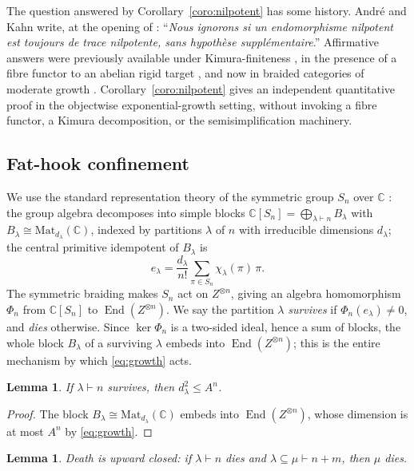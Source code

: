 \documentclass[11pt]{article}
\newtheorem{lemm}[theo]{Lemma}
\newcommand{\End}{\operatorname{End}}
\begin{document}
The question answered by Corollary~\ref{coro:nilpotent} has some
history. Andr\'e and Kahn write, at the opening of
\cite[\S7.3]{AK02}: ``\emph{Nous ignorons si un endomorphisme
nilpotent est toujours de trace nilpotente, sans hypoth\`ese
suppl\'ementaire}.'' Affirmative answers were previously available
under Kimura-finiteness \cite[Thm~9.2.2, Prop~7.3.3]{AK02}, in the
presence of a fibre functor to an abelian rigid target
\cite[Prop~7.3.3]{AK02}, and now in braided categories of moderate
growth \cite{EP26}. Corollary~\ref{coro:nilpotent} gives an
independent quantitative proof in the objectwise
exponential-growth setting, without invoking a fibre functor, a
Kimura decomposition, or the semisimplification machinery.

\subsection{Fat-hook confinement}\label{subsec:fathook}

We use the standard representation theory of the symmetric group
$S_{n}$ over $\mathbb{C}$ \cite{Sag01,FH91}: the group algebra
decomposes into simple blocks
$\mathbb{C}[S_{n}]=\bigoplus_{\lambda\vdash n}B_{\lambda}$ with
$B_{\lambda}\cong\mathrm{Mat}_{d_{\lambda}}(\mathbb{C})$, indexed
by partitions $\lambda$ of $n$ with irreducible dimensions
$d_{\lambda}$; the central primitive idempotent of $B_{\lambda}$ is
\[
e_{\lambda}
=\frac{d_{\lambda}}{n!}\sum_{\pi\in S_{n}}\chi_{\lambda}(\pi)\,\pi .
\]
The symmetric braiding makes $S_{n}$ act on $Z^{\otimes n}$, giving
an algebra homomorphism $\Phi_{n}$ from $\mathbb{C}[S_{n}]$ to
$\End(Z^{\otimes n})$. We say the
partition $\lambda$ \emph{survives} if
$\Phi_{n}(e_{\lambda})\ne 0$, and \emph{dies} otherwise. Since
$\ker\Phi_{n}$ is a two-sided ideal, hence a sum of blocks, the
whole block $B_{\lambda}$ of a surviving $\lambda$ embeds into
$\End(Z^{\otimes n})$; this is the entire mechanism by which
\eqref{eq:growth} acts.

\begin{lemm}\label{lemm:blockdeath}
If $\lambda\vdash n$ survives, then $d_{\lambda}^{2}\le A^{n}$.
\end{lemm}

\begin{proof}
The block $B_{\lambda}\cong\mathrm{Mat}_{d_{\lambda}}(\mathbb{C})$
embeds into $\End(Z^{\otimes n})$, whose dimension is at most
$A^{n}$ by \eqref{eq:growth}.
\end{proof}

\begin{lemm}\label{lemm:upward}
Death is upward closed: if $\lambda\vdash n$ dies and
$\lambda\subseteq\mu\vdash n+m$, then $\mu$ dies.
\end{lemm}
\end{document}
